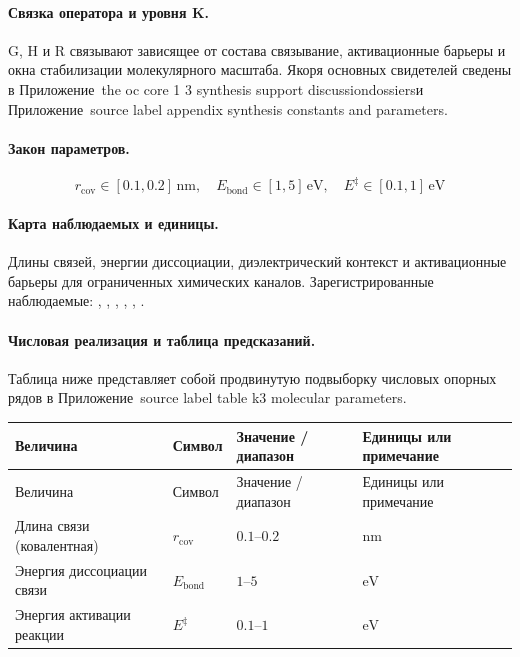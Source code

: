 \paragraph{Связка оператора и уровня K.}
G, H и R связывают зависящее от состава связывание, активационные барьеры и окна стабилизации молекулярного масштаба.
Якоря основных свидетелей сведены в Приложение~the oc core 1 3 synthesis support discussiondossiersи Приложение~source label appendix synthesis constants and parameters.

\paragraph{Закон параметров.}
\[
r_{\mathrm{cov}} \in [0.1, 0.2]\,\mathrm{nm},\quad E_{\mathrm{bond}} \in [1, 5]\,\mathrm{eV},\quad E^\ddagger \in [0.1, 1]\,\mathrm{eV}
\]

\paragraph{Карта наблюдаемых и единицы.}
Длины связей, энергии диссоциации, диэлектрический контекст и активационные барьеры для ограниченных химических каналов.
Зарегистрированные наблюдаемые: , \allowbreak {}, \allowbreak {}, \allowbreak {}, \allowbreak {}, \allowbreak {}.

\paragraph{Числовая реализация и таблица предсказаний.}
Таблица ниже представляет собой продвинутую подвыборку числовых опорных рядов в Приложение~source label table k3 molecular parameters.
\begin{longtable}{@{}L{0.27\textwidth}L{0.15\textwidth}L{0.24\textwidth}L{0.16\textwidth}@{}}
\toprule
Величина & Символ & Значение / диапазон & Единицы или примечание \\
\midrule
\endfirsthead
\toprule
Величина & Символ & Значение / диапазон & Единицы или примечание \\
\midrule
\endhead
Длина связи (ковалентная) & $\scriptstyle r_{\mathrm{cov}}$ & $0.1\text{--}0.2$ & $\mathrm{nm}$ \\
Энергия диссоциации связи & $\scriptstyle E_{\mathrm{bond}}$ & $1\text{--}5$ & $\mathrm{eV}$ \\
Энергия активации реакции & $\scriptstyle E^\ddagger$ & $0.1\text{--}1$ & $\mathrm{eV}$ \\
\bottomrule
\end{longtable}

